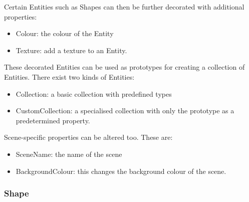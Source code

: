 \documentclass[a4paper,12pt]{article}
\begin{document}
Certain Entities such as Shapes can then be further decorated with additional properties:
\begin{itemize}
\item Colour: the colour of the Entity
\item Texture: add a texture to an Entity.
\end{itemize}

These decorated Entities can be used as prototypes for creating a collection of Entities. There exist two kinds of Entities:
\begin{itemize}
\item Collection: a basic collection with predefined types
\item CustomCollection: a specialised collection with only the prototype as a predetermined property.
\end{itemize}

Scene-specific properties can be altered too. These are:
\begin{itemize}
\item SceneName: the name of the scene
\item BackgroundColour: this changes the background colour of the scene.
\end{itemize}

\subsubsection{Shape}
\end{document}
